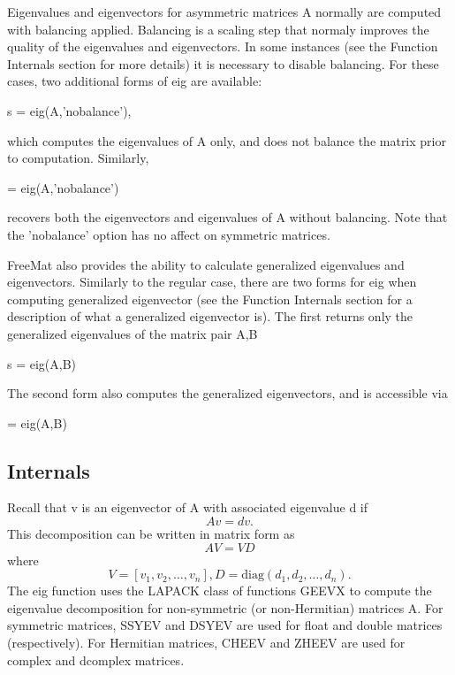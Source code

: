 Eigenvalues and eigenvectors for asymmetric matrices {\ttfamily A} normally are computed with balancing applied. Balancing is a scaling step that normaly improves the quality of the eigenvalues and eigenvectors. In some instances (see the Function Internals section for more details) it is necessary to disable balancing. For these cases, two additional forms of {\ttfamily eig} are available\-: \begin{DoxyVerb}  s = eig(A,'nobalance'),
\end{DoxyVerb}
 which computes the eigenvalues of {\ttfamily A} only, and does not balance the matrix prior to computation. Similarly, \begin{DoxyVerb}  [V,D] = eig(A,'nobalance')
\end{DoxyVerb}
 recovers both the eigenvectors and eigenvalues of {\ttfamily A} without balancing. Note that the 'nobalance' option has no affect on symmetric matrices.

Free\-Mat also provides the ability to calculate generalized eigenvalues and eigenvectors. Similarly to the regular case, there are two forms for {\ttfamily eig} when computing generalized eigenvector (see the Function Internals section for a description of what a generalized eigenvector is). The first returns only the generalized eigenvalues of the matrix pair {\ttfamily A,B} \begin{DoxyVerb}  s = eig(A,B)
\end{DoxyVerb}
 The second form also computes the generalized eigenvectors, and is accessible via \begin{DoxyVerb}  [V,D] = eig(A,B)
\end{DoxyVerb}
 \hypertarget{transforms_svd_Function}{}\subsection{Internals}\label{transforms_svd_Function}
Recall that {\ttfamily v} is an eigenvector of {\ttfamily A} with associated eigenvalue {\ttfamily d} if \[ A v = d v. \] This decomposition can be written in matrix form as \[ A V = V D \] where \[ V = [v_1,v_2,\ldots,v_n], D = \mathrm{diag}(d_1,d_2,\ldots,d_n). \] The {\ttfamily eig} function uses the {\ttfamily L\-A\-P\-A\-C\-K} class of functions {\ttfamily G\-E\-E\-V\-X} to compute the eigenvalue decomposition for non-\/symmetric (or non-\/\-Hermitian) matrices {\ttfamily A}. For symmetric matrices, {\ttfamily S\-S\-Y\-E\-V} and {\ttfamily D\-S\-Y\-E\-V} are used for {\ttfamily float} and {\ttfamily double} matrices (respectively). For Hermitian matrices, {\ttfamily C\-H\-E\-E\-V} and {\ttfamily Z\-H\-E\-E\-V} are used for {\ttfamily complex} and {\ttfamily dcomplex} matrices.

